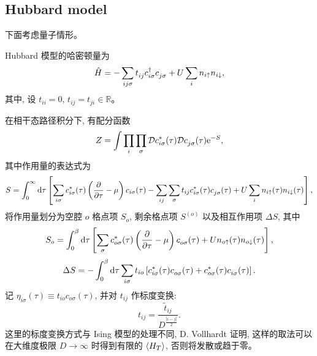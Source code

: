 \subsection{Hubbard model}
下面考虑量子情形。

Hubbard 模型的哈密顿量为
\begin{equation}
    \hat{H}=-\sum_{ij\sigma}t_{ij}^{ }c_{i\sigma}^\dagger c_{j\sigma}^{ }+U\sum_i n_{i\uparrow} n_{i\downarrow},
\end{equation}
其中, 设 $t_{ii}=0$, $t_{ij}=t_{ji}\in \mathbb{R}$。

在相干态路径积分下, 有配分函数 
\begin{equation}
    Z=\int\prod_{i}\prod_\sigma \mathcal{D}c_{i\sigma}^*(\tau)\mathcal{D}c_{j\sigma}^{ }(\tau)\mathrm{e}^{-S},
\end{equation}
其中作用量的表达式为
\begin{equation}
    S=\int_0^\infty\mathrm{d}\tau\left[ \sum_{i\sigma}c_{i\sigma}^*(\tau)\left( \frac{\partial}{\partial \tau}-\mu \right) c_{i\sigma}(\tau)-\sum_{ij}\sum_\sigma t_{ij}c_{i\sigma}^*(\tau)c_{j\sigma}^{ }(\tau)+U\sum_i n_{i\uparrow}(\tau)n_{i\downarrow}(\tau) \right],
\end{equation}
将作用量划分为空腔 $o$ 格点项 $S_o$, 剩余格点项 $S^{(o)}$ 以及相互作用项 $\Delta S$, 其中 
\begin{equation}
    S_o=\int_0^\beta\mathrm{d}\tau\left[ \sum_\sigma c_{o\sigma}^*(\tau)\left( \frac{\partial}{\partial \tau}-\mu \right) c_{o\sigma}^{ }(\tau)+Un_{o\uparrow}(\tau)n_{o\downarrow}(\tau) \right],
\end{equation}
\begin{equation}
    \Delta S=-\int_0^\beta \mathrm{d}\tau\sum_{i\sigma}t_{io}\left[ c_{i\sigma}^*(\tau)c_{o\sigma}^{ }(\tau)+c_{o\sigma}^*(\tau)c_{i\sigma}^{ }(\tau) \right].
\end{equation}
记 $\eta_{i\sigma}(\tau)\equiv t_{io}c_{o\sigma}(\tau)$, 并对 $t_{ij}$ 作标度变换:
\begin{equation}
    t_{ij}=\frac{\tilde{t}_{ij}}{D^{\frac{|i-j|}{2}}}.
\end{equation}
这里的标度变换方式与 Ising 模型的处理不同, D. Vollhardt 证明, 这样的取法可以在大维度极限 $D\to \infty$ 时得到有限的 $\langle H_T \rangle$, 否则将发散或趋于零\cite{PhysRevLett.62.324}。

